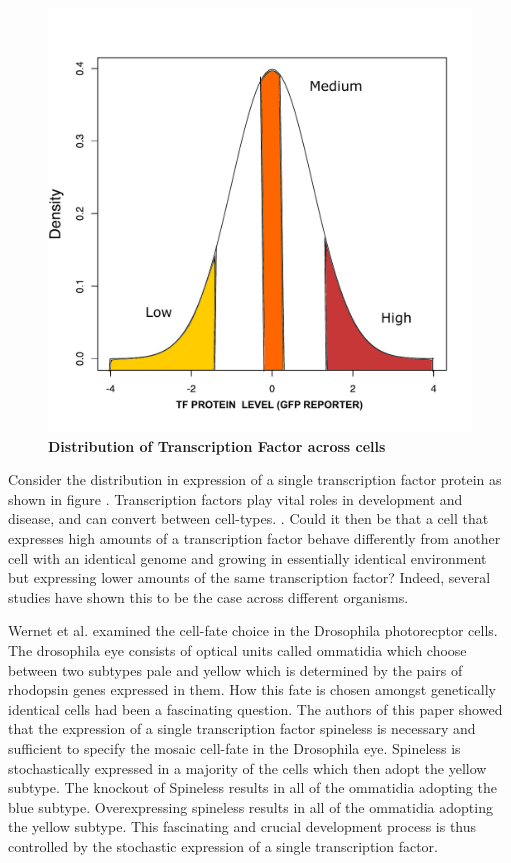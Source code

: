 \begin{figure}[t!]  
    \centering
    \includegraphics[width=\linewidth, scale=0.5]{figures/intro/intro_gfp_density_X.pdf}
    \caption[Distribution of Transcription Factor across cells.]{%
        \textbf{Distribution of Transcription Factor across cells}
    }
    \label{fig:gfpXdensity}
\end{figure}

Consider the distribution in expression of a single transcription factor protein as shown in figure \cite{fig:gfpXdensity}. Transcription factors play vital roles in development and disease, and can convert between cell-types. \cite {Tim Hughes}. Could it then be that a cell that expresses high amounts of a transcription factor behave differently from another cell with an identical genome and growing in essentially identical environment but expressing lower amounts of the same transcription factor? Indeed, several studies have shown this to be the case across different organisms.

Wernet et al. \cite{Wernet} examined the cell-fate choice in the Drosophila photorecptor cells. The drosophila eye consists of optical units called ommatidia which choose between two subtypes pale and yellow which is determined by the pairs of rhodopsin genes expressed in them. How this fate is chosen amongst genetically identical cells had been a fascinating question. The authors of this paper showed that the expression of a single transcription factor spineless is necessary and sufficient to specify the mosaic cell-fate in the Drosophila eye. Spineless is stochastically expressed in a majority of the cells which then adopt the yellow subtype. The knockout of Spineless results in all of the ommatidia adopting the blue subtype. Overexpressing spineless results in all of the ommatidia adopting the yellow subtype. This fascinating and crucial development process is thus controlled by the stochastic expression of a single transcription factor.

